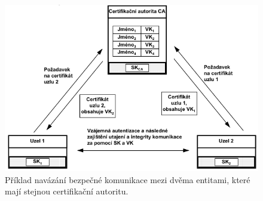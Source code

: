 \begin{figure}[H]
    \centering
    \includegraphics[width=1\linewidth]{vymena_certifikatu.pdf}
    \caption{Příklad navázání bezpečné komunikace mezi dvěma entitami, které mají stejnou certifikační autoritu.}
    \label{53_vymena_certifikatu}
\end{figure}

